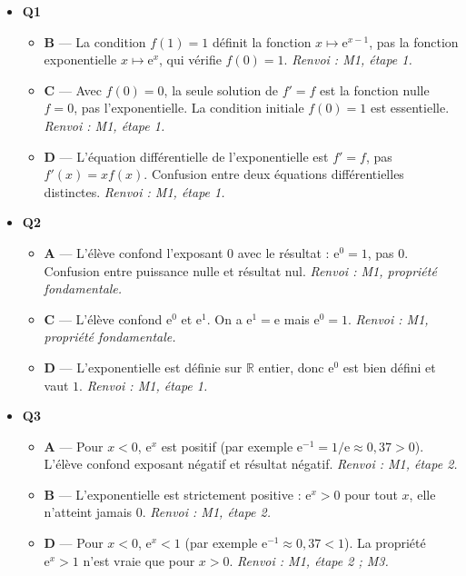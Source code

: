 \begin{itemize}
  \item \textbf{Q1}
  \begin{itemize}
    \item \textbf{B} — La condition $f(1)=1$ définit la fonction $x\mapsto \mathrm{e}^{x-1}$, pas la fonction exponentielle $x\mapsto \mathrm{e}^x$, qui vérifie $f(0)=1$. \emph{Renvoi : M1, étape 1.}
    \item \textbf{C} — Avec $f(0) = 0$, la seule solution de $f' = f$ est la fonction nulle $f = 0$, pas l'exponentielle. La condition initiale $f(0) = 1$ est essentielle. \emph{Renvoi : M1, étape 1.}
    \item \textbf{D} — L'équation différentielle de l'exponentielle est $f' = f$, pas $f'(x) = xf(x)$. Confusion entre deux équations différentielles distinctes. \emph{Renvoi : M1, étape 1.}
  \end{itemize}
  \item \textbf{Q2}
  \begin{itemize}
    \item \textbf{A} — L'élève confond l'exposant $0$ avec le résultat : $\mathrm{e}^0 = 1$, pas $0$. Confusion entre puissance nulle et résultat nul. \emph{Renvoi : M1, propriété fondamentale.}
    \item \textbf{C} — L'élève confond $\mathrm{e}^0$ et $\mathrm{e}^1$. On a $\mathrm{e}^1 = \mathrm{e}$ mais $\mathrm{e}^0 = 1$. \emph{Renvoi : M1, propriété fondamentale.}
    \item \textbf{D} — L'exponentielle est définie sur $\mathbb{R}$ entier, donc $\mathrm{e}^0$ est bien défini et vaut $1$. \emph{Renvoi : M1, étape 1.}
  \end{itemize}
  \item \textbf{Q3}
  \begin{itemize}
    \item \textbf{A} — Pour $x < 0$, $\mathrm{e}^x$ est positif (par exemple $\mathrm{e}^{-1} = 1/\mathrm{e} \approx 0{,}37 > 0$). L'élève confond exposant négatif et résultat négatif. \emph{Renvoi : M1, étape 2.}
    \item \textbf{B} — L'exponentielle est strictement positive : $\mathrm{e}^x > 0$ pour tout $x$, elle n'atteint jamais $0$. \emph{Renvoi : M1, étape 2.}
    \item \textbf{D} — Pour $x < 0$, $\mathrm{e}^x < 1$ (par exemple $\mathrm{e}^{-1} \approx 0{,}37 < 1$). La propriété $\mathrm{e}^x > 1$ n'est vraie que pour $x > 0$. \emph{Renvoi : M1, étape 2 ; M3.}
  \end{itemize}

\end{itemize}
